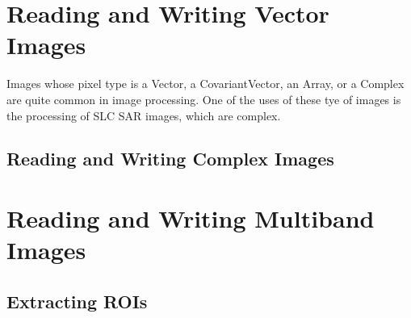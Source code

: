 %


\section{Reading and Writing Vector Images}
\label{sec:VectorImagReadWrite}

Images whose pixel type is a Vector, a CovariantVector, an Array, or a Complex
are quite common in image processing. One of the uses of these tye of
images is the processing of SLC SAR images, which are complex.


%

%

%


\subsection{Reading and Writing Complex Images}
\label{sec:ComplexImagReadWrite}


\section{Reading and Writing Multiband Images}
\label{sec:MultibandImagReadWrite}


\subsection{Extracting ROIs}
\label{sec:ExtractROI}



